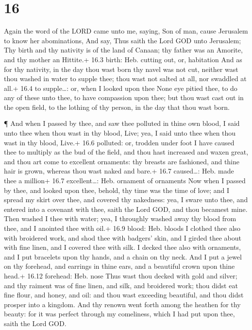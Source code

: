 \hypertarget{section-15}{%
\section{16}\label{section-15}}

 Again the word of the LORD came unto me, saying,
 Son of man, cause Jerusalem to know her abominations,
 And say, Thus saith the Lord GOD unto Jerusalem; Thy birth
and thy nativity is of the land of Canaan; thy father was an Amorite,
and thy mother an Hittite.+ 16.3 birth: Heb. cutting out, or, habitation
 And as for thy nativity, in the day thou wast born thy
navel was not cut, neither wast thou washed in water to supple thee;
thou wast not salted at all, nor swaddled at all.+ 16.4 to supple\ldots:
or, when I looked upon thee  None eye pitied thee, to do any
of these unto thee, to have compassion upon thee; but thou wast cast out
in the open field, to the lothing of thy person, in the day that thou
wast born.

 ¶ And when I passed by thee, and saw thee polluted in thine
own blood, I said unto thee when thou wast in thy blood, Live; yea, I
said unto thee when thou wast in thy blood, Live.+ 16.6 polluted: or,
trodden under foot  I have caused thee to multiply as the
bud of the field, and thou hast increased and waxen great, and thou art
come to excellent ornaments: thy breasts are fashioned, and thine hair
is grown, whereas thou wast naked and bare.+ 16.7 caused\ldots: Heb.
made thee a million+ 16.7 excellent\ldots: Heb. ornament of ornaments
 Now when I passed by thee, and looked upon thee, behold,
thy time was the time of love; and I spread my skirt over thee, and
covered thy nakedness: yea, I sware unto thee, and entered into a
covenant with thee, saith the Lord GOD, and thou becamest mine.
 Then washed I thee with water; yea, I throughly washed away
thy blood from thee, and I anointed thee with oil.+ 16.9 blood: Heb.
bloods  I clothed thee also with broidered work, and shod
thee with badgers' skin, and I girded thee about with fine linen, and I
covered thee with silk.  I decked thee also with ornaments,
and I put bracelets upon thy hands, and a chain on thy neck.
 And I put a jewel on thy forehead, and earrings in thine
ears, and a beautiful crown upon thine head.+ 16.12 forehead: Heb. nose
 Thus wast thou decked with gold and silver; and thy
raiment was of fine linen, and silk, and broidered work; thou didst eat
fine flour, and honey, and oil: and thou wast exceeding beautiful, and
thou didst prosper into a kingdom.  And thy renown went
forth among the heathen for thy beauty: for it was perfect through my
comeliness, which I had put upon thee, saith the Lord GOD.

